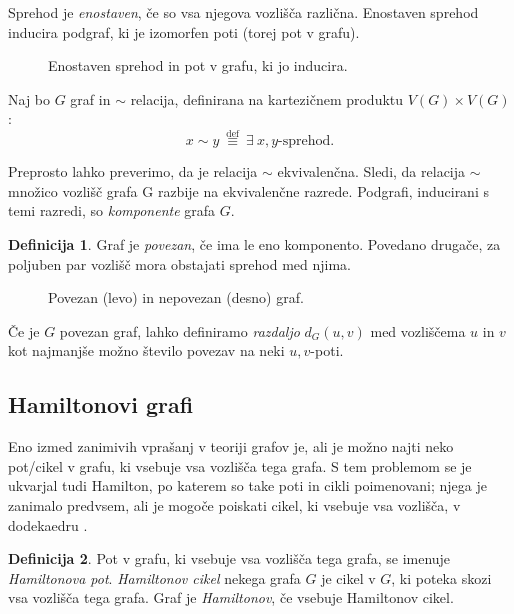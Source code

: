 \documentclass[12pt,a4paper]{amsart}
\theoremstyle{definition} %
\newtheorem{definicija}{Definicija}[section]
\theoremstyle{plain} %
\newcommand{\vozlisca}[1][G]{\ensuremath{V(#1)}}
\begin{document}
Sprehod je \emph{enostaven}, če so vsa njegova vozlišča različna. Enostaven sprehod inducira podgraf, ki je izomorfen poti (torej pot v grafu).

\begin{figure}[h]
    \caption{Enostaven sprehod in pot v grafu, ki jo inducira.}
\end{figure}

Naj bo $G$ graf in $\sim$ relacija, definirana na kartezičnem produktu $\vozlisca \times \vozlisca$:
\[ x \sim y \ \stackrel{\text{def}}{\equiv} \ \exists \ x,y \text{-sprehod.} \]

Preprosto lahko preverimo, da je relacija $\sim$ ekvivalenčna. Sledi, da relacija $\sim$ množico vozlišč grafa G razbije na ekvivalenčne razrede. Podgrafi, inducirani s temi razredi, so \emph{komponente} grafa $G$.

\begin{definicija}
	Graf je \emph{povezan}, če ima le eno komponento. Povedano drugače, za poljuben par vozlišč mora obstajati sprehod med njima.
\end{definicija}

\begin{figure}[h]
    \caption{Povezan (levo) in nepovezan (desno) graf.}
\end{figure}

Če je $G$ povezan graf, lahko definiramo \emph{razdaljo} $d_G(u,v)$ med vozliščema $u$ in $v$ kot najmanjše možno število povezav na neki $u,v$-poti.

\subsection{Hamiltonovi grafi}

Eno izmed zanimivih vprašanj v teoriji grafov je, ali je možno najti neko pot/cikel v grafu, ki vsebuje vsa vozlišča tega grafa. S tem problemom se je ukvarjal tudi Hamilton, po katerem so take poti in cikli poimenovani; njega je zanimalo predvsem, ali je mogoče poiskati cikel, ki vsebuje vsa vozlišča, v dodekaedru \cite{bib:wikihamilpath}.

\begin{definicija}
	Pot v grafu, ki vsebuje vsa vozlišča tega grafa, se imenuje \emph{Hamiltonova pot}.
	\emph{Hamiltonov cikel} nekega grafa $G$ je cikel v $G$, ki poteka skozi vsa vozlišča tega grafa.
	Graf je \emph{Hamiltonov}, če vsebuje Hamiltonov cikel.
\end{definicija}
\end{document}
